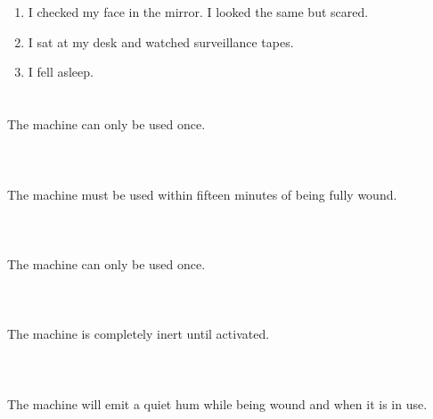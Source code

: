 \documentclass{article}
\begin{document}
    \newpage
    
    \section{}
    
    \begin{enumerate}
    
    \item I checked my face in the mirror. I looked the same but scared.\\
    
    \item I sat at my desk and watched surveillance tapes.\\
    
    \item I fell asleep.\\
    
    \end{enumerate}
     
    \newpage
    
    \section{}
    The machine can only be used once.\\\\ 
    \newpage
    
    \section{}
    The machine must be used within fifteen minutes of being fully wound.\\\\ 
    \newpage
    
    \section{}
    The machine can only be used once.\\\\ 
    \newpage
    
    \section{}
    The machine is completely inert until activated.\\\\ 
    \newpage
    
    \section{}
    The machine will emit a quiet hum while being wound and when it is in use.\\\\ 
    \newpage
    
\end{document}
